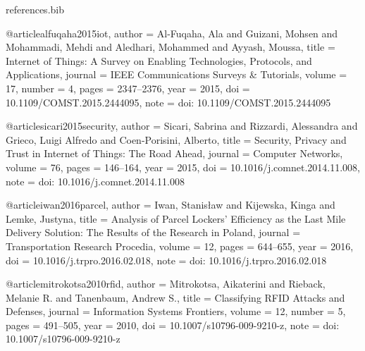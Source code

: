 \begin{filecontents*}[overwrite]{references.bib}
%

@article{alfuqaha2015iot,
  author  = {Al-Fuqaha, Ala and Guizani, Mohsen and Mohammadi, Mehdi and Aledhari, Mohammed and Ayyash, Moussa},
  title   = {Internet of Things: A Survey on Enabling Technologies, Protocols, and Applications},
  journal = {IEEE Communications Surveys \& Tutorials},
  volume  = {17},
  number  = {4},
  pages   = {2347--2376},
  year    = {2015},
  doi     = {10.1109/COMST.2015.2444095},
  note    = {doi: 10.1109/COMST.2015.2444095}
}

@article{sicari2015security,
  author  = {Sicari, Sabrina and Rizzardi, Alessandra and Grieco, Luigi Alfredo and Coen-Porisini, Alberto},
  title   = {Security, Privacy and Trust in {Internet of Things}: The Road Ahead},
  journal = {Computer Networks},
  volume  = {76},
  pages   = {146--164},
  year    = {2015},
  doi     = {10.1016/j.comnet.2014.11.008},
  note    = {doi: 10.1016/j.comnet.2014.11.008}
}

@article{iwan2016parcel,
  author  = {Iwan, Stanis{\l}aw and Kijewska, Kinga and Lemke, Justyna},
  title   = {Analysis of Parcel Lockers' Efficiency as the Last Mile Delivery Solution: The Results of the Research in {Poland}},
  journal = {Transportation Research Procedia},
  volume  = {12},
  pages   = {644--655},
  year    = {2016},
  doi     = {10.1016/j.trpro.2016.02.018},
  note    = {doi: 10.1016/j.trpro.2016.02.018}
}

@article{mitrokotsa2010rfid,
  author  = {Mitrokotsa, Aikaterini and Rieback, Melanie R. and Tanenbaum, Andrew S.},
  title   = {Classifying {RFID} Attacks and Defenses},
  journal = {Information Systems Frontiers},
  volume  = {12},
  number  = {5},
  pages   = {491--505},
  year    = {2010},
  doi     = {10.1007/s10796-009-9210-z},
  note    = {doi: 10.1007/s10796-009-9210-z}
}


\end{filecontents*}
